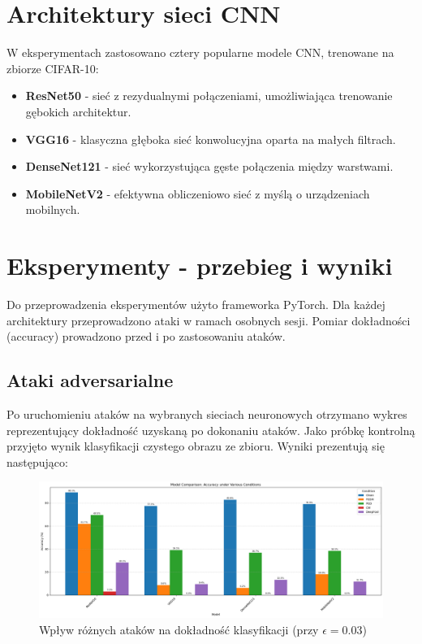 \documentclass[12pt]{article}
\begin{document}
\section{Architektury sieci CNN}
W eksperymentach zastosowano cztery popularne modele CNN, trenowane na zbiorze CIFAR-10:
\begin{itemize}
    \item \textbf{ResNet50} \cite{he2016deep} - sieć z rezydualnymi połączeniami, umożliwiająca trenowanie gębokich architektur.
    \item \textbf{VGG16} \cite{simonyan2014very} - klasyczna głęboka sieć konwolucyjna oparta na małych filtrach.
    \item \textbf{DenseNet121} \cite{huang2017densely} - sieć wykorzystująca gęste połączenia między warstwami.
    \item \textbf{MobileNetV2} \cite{sandler2018mobilenetv2} - efektywna obliczeniowo sieć z myślą o urządzeniach mobilnych.
\end{itemize}

\section{Eksperymenty - przebieg i wyniki}
Do przeprowadzenia eksperymentów użyto frameworka PyTorch. Dla każdej architektury przeprowadzono ataki w ramach osobnych sesji. Pomiar dokładności (accuracy) prowadzono przed i po zastosowaniu ataków.
\subsection{Ataki adversarialne}
Po uruchomieniu ataków na wybranych sieciach neuronowych otrzymano wykres reprezentujący dokładność uzyskaną po dokonaniu ataków. Jako próbkę kontrolną przyjęto wynik klasyfikacji czystego obrazu ze zbioru. Wyniki prezentują się następująco:
\begin{figure}[H]
    \centering
    \includegraphics[width=1\textwidth]{model_comparison.png} %
    \caption{Wpływ różnych ataków na dokładność klasyfikacji (przy $\epsilon = 0.03$)}
\end{figure}
\end{document}
